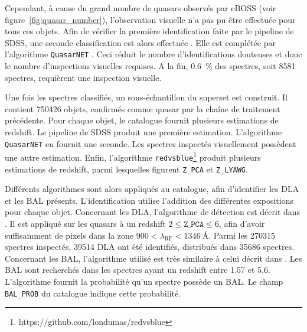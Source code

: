\documentclass[11pt, twoside, a4paper, openright]{report}
\begin{document}
Cependant, à cause du grand nombre de quasars observés par eBOSS (voir figure~\ref{fig:quasar_number}), l'observation visuelle n'a pas pu être effectuée pour tous ces objets.
Afin de vérifier la première identification faite par le pipeline de SDSS, une seconde classification est alors effectuée \citep{CITE:Lyke in prep}. Elle est complétée par l'algorithme \texttt{QuasarNET} \citep{Busca2018}. Ceci réduit le nombre d'identifications douteuses et donc le nombre d'inspections visuelles requises. A la fin, \SI{0.6}{\percent} des spectres, soit \num{8581} spectres, requièrent une inspection visuelle.

Une fois les spectres classifiés, un sous-échantillon du superset est construit. Il contient \num{750426} objets, confirmés comme quasar par la chaîne de traitement précédente.
Pour chaque objet, le catalogue fournit plusieurs estimations de redshift. Le pipeline de SDSS produit une première estimation. L'algorithme \texttt{QuasarNET} en fournit une seconde. Les spectres inspectés visuellement possèdent une autre estimation. Enfin, l'algorithme \texttt{redvsblue}\footnote{https://github.com/londumas/redvsblue} produit plusieurs estimations de redshift, parmi lesquelles figurent \texttt{Z\_PCA} et \texttt{Z\_LYAWG}.

Différents algorithmes sont alors appliqués au catalogue, afin d'identifier les DLA et les BAL présents. L'identification utilise l'addition des différentes expositions pour chaque objet.
Concernant les DLA, l'algorithme de détection est décrit dans \citet{Parks2017}. Il est appliqué sur les quasars à un redshift $2 \leq \texttt{Z\_PCA} \leq 6$, afin d'avoir suffisamment de pixels dans la zone $900 < \lambda_{\mathrm{RF}} < \SI{1346}{\angstrom}$. Parmi les \num{270315} spectres inspectés, \num{39514} DLA ont été identifiés, distribués dans \num{35686} spectres.
Concernant les BAL, l'algorithme utilisé est très similaire à celui décrit dans \citet{Guo2019}. Les BAL sont recherchés dans les spectres ayant un redshift entre \num{1.57} et \num{5.6}. L'algorithme fournit la probabilité qu'un spectre possède un BAL. Le champ \texttt{BAL\_PROB} du catalogue indique cette probabilité.
\end{document}

